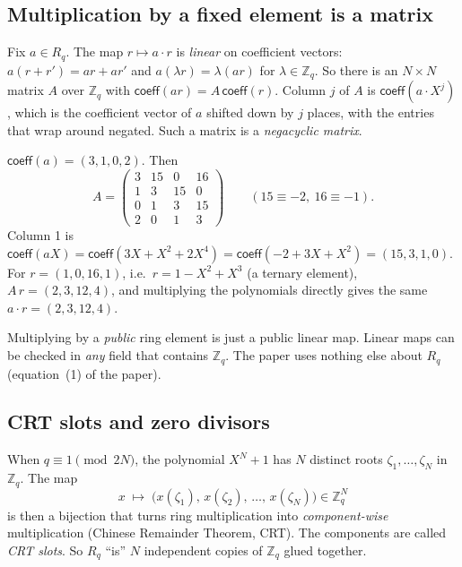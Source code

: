 \documentclass[11pt,a4paper]{article}
\newcommand{\Zq}{\mathbb{Z}_q}
\newcommand{\Rq}{R_q}
\newcommand{\coeff}{\mathsf{coeff}}
\theoremstyle{definition}
\theoremstyle{plain}
\begin{document}
\subsection{Multiplication by a fixed element is a matrix}
\label{sec:negacyclic}

Fix $a\in\Rq$. The map $r\mapsto a\cdot r$ is \emph{linear} on coefficient vectors: $a(r+r')=ar+ar'$
and $a(\lambda r)=\lambda(ar)$ for $\lambda\in\Zq$. So there is an $N\times N$ matrix $A$ over $\Zq$ with
$\coeff(ar)=A\,\coeff(r)$. Column $j$ of $A$ is $\coeff(a\cdot X^j)$, which is the coefficient vector
of $a$ shifted down by $j$ places, with the entries that wrap around negated. Such a matrix is a
\emph{negacyclic matrix}.

\begin{example}[The matrix of $a=3+X+2X^3$ modulo 17]
$\coeff(a)=(3,1,0,2)$. Then
\[
A=\begin{pmatrix}3&15&0&16\\1&3&15&0\\0&1&3&15\\2&0&1&3\end{pmatrix}
\qquad (15\equiv -2,\ 16\equiv -1).
\]
Column 1 is $\coeff(aX)=\coeff(3X+X^2+2X^4)=\coeff(-2+3X+X^2)=(15,3,1,0)$.
For $r=(1,0,16,1)$, i.e.\ $r=1-X^2+X^3$ (a ternary element),
$A\,r = (2,3,12,4)$, and multiplying the polynomials directly gives the same $a\cdot r=(2,3,12,4)$.
\end{example}

\begin{why}
Multiplying by a \emph{public} ring element is just a public linear map. Linear maps can be
checked in \emph{any} field that contains $\Zq$. The paper uses nothing else about $\Rq$
(equation~(1) of the paper).
\end{why}

\subsection{CRT slots and zero divisors}
\label{sec:slots}

When $q\equiv 1\pmod{2N}$, the polynomial $X^N+1$ has $N$ distinct roots $\zeta_1,\dots,\zeta_N$
in $\Zq$. The map
\[
  x \;\longmapsto\; \bigl(x(\zeta_1),\,x(\zeta_2),\,\dots,\,x(\zeta_N)\bigr)\in\Zq^N
\]
is then a bijection that turns ring multiplication into \emph{component-wise} multiplication
(Chinese Remainder Theorem, CRT). The components are called \emph{CRT slots}. So $\Rq$ ``is''
$N$ independent copies of $\Zq$ glued together.
\end{document}
